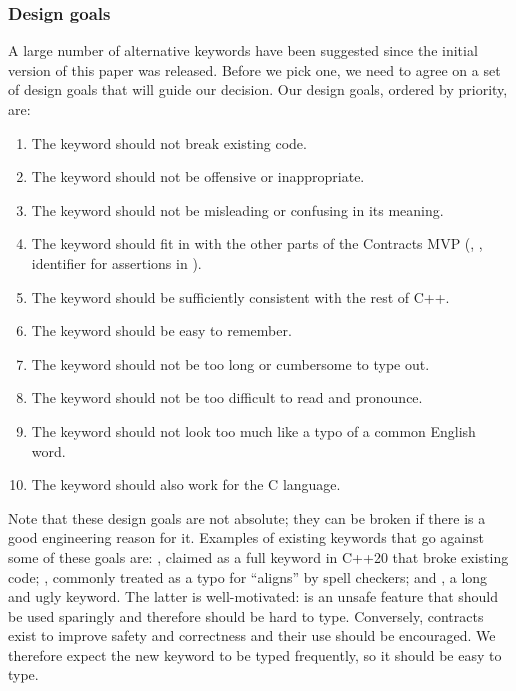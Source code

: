 \subsubsection{Design goals}
\label{subsubsec:keyword_goals}
A large number of alternative keywords have been suggested since the initial version of this paper was released. Before we pick one, we need to agree on a set of design goals that will guide our decision. Our design goals, ordered by priority, are:
\begin{enumerate}
\item The keyword should not break existing code.
\item The keyword should not be offensive or inappropriate.
\item The keyword should not be misleading or confusing in its meaning.
\item The keyword should fit in with the other parts of the Contracts MVP (, , identifier for assertions in \mbox{}).
\item The keyword should be sufficiently consistent with the rest of C++.
\item The keyword should be easy to remember.
\item The keyword should not be too long or cumbersome to type out.
\item The keyword should not be too difficult to read and pronounce.
\item The keyword should not look too much like a typo of a common English word.
\item The keyword should also work for the C language.
\end{enumerate}
Note that these design goals are not absolute; they can be broken if there is a good engineering reason for it. Examples of existing keywords that go against some of these goals are: , claimed as a full keyword in C++20 that broke existing code; , commonly treated as a typo for ``aligns'' by spell checkers; and , a long and ugly keyword. The latter is well-motivated:  is an unsafe feature that should be used sparingly and therefore should be hard to type. Conversely, contracts exist to improve safety and correctness and their use should be encouraged. We therefore expect the new keyword to be typed frequently, so it should be easy to type.



